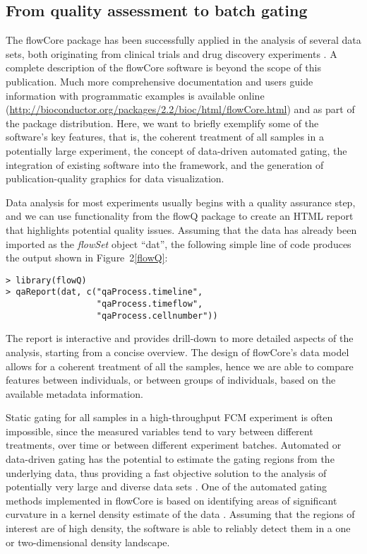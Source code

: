 \documentclass[10pt]{bmc_article}
\newcommand{\Rpackage}[1]{{\textsf{#1}}}
\newcommand{\Rclass}[1]{{\textit{#1}}}
\newenvironment{bmcformat}{\begin{raggedright}\baselineskip20pt\sloppy\setboolean{publ}{false}}{\end{raggedright}\baselineskip20pt\sloppy}
\begin{document}
\begin{bmcformat}
\subsection*{From quality assessment to batch gating}
The \Rpackage{flowCore} package has been successfully applied in the
analysis of several data sets, both originating from clinical trials
\cite{brinkman2007hcf} and drug discovery experiments
\cite{gasparetto2004ice}. A complete description of the
\Rpackage{flowCore} software is beyond the scope of this publication.
Much more comprehensive documentation and users guide information with
programmatic examples is available online
(\url{http://bioconductor.org/packages/2.2/bioc/html/flowCore.html})
and as part of the package distribution. Here, we want to briefly
exemplify some of the software's key features, that is, the coherent
treatment of all samples in a potentially large experiment, the
concept of data-driven automated gating, the integration of existing
software into the framework, and the generation of publication-quality
graphics for data visualization.

Data analysis for most experiments usually begins with a quality
assurance step, and we can use functionality from the \Rpackage{flowQ}
package to create an HTML report that highlights potential quality
issues. Assuming that the data has already been imported as the
\Rclass{flowSet} object ``dat'', the following simple line of code
produces the output shown in Figure~2\ref{flowQ}:

\begin{verbatim}
> library(flowQ)
> qaReport(dat, c("qaProcess.timeline", 
                  "qaProcess.timeflow", 
                  "qaProcess.cellnumber"))
\end{verbatim}

The report is interactive and provides drill-down to more detailed
aspects of the analysis, starting from a concise overview. The design
of \Rpackage{flowCore}'s data model allows for a coherent treatment of
all the samples, hence we are able to compare features between
individuals, or between groups of individuals, based on the available
metadata information.


Static gating for all samples in a high-throughput FCM experiment is
often impossible, since the measured variables tend to vary between
different treatments, over time or between different experiment
batches. Automated or data-driven gating has the potential to estimate
the gating regions from the underlying data, thus providing a fast
objective solution to the analysis of potentially very large and
diverse data sets \cite{lo2008agf}. One of the automated gating
methods implemented in \Rpackage{flowCore} is based on identifying
areas of significant curvature in a kernel density estimate of the
data \cite{wand2008}. Assuming that the regions of interest are of
high density, the software is able to reliably detect them in a one or
two-dimensional density landscape.


\end{bmcformat}
\end{document}
